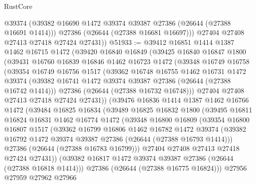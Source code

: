 \begin{lexlean}{RustCore}
\begin{coremodule}
          @39374
          (@39382 @16690 @1472 @39374 @39387 @27386 (@26644 (@27388 @16691 @1414)))
          @27386
          (@26644 (@27388 @16681 @16697)))
        @27404
        @27408
        @27413
        @27418
        @27424
        @27431))
@51933 := @39412
    @16851
    @1414
    @1387
    @1462
    @16715
    @1472
    (@39420
      @16840
      @16849
      (@39425
        @16840
        @16847
        @1800
        (@39431
          @16760
          @16839
          @16846
          @1462
          @16723
          @1472
          (@39348
            @16749
            @16758
            (@39354
              @16749
              @16756
              @1517
              (@39362
                @16748
                @16755
                @1462
                @16731
                @1472
                @39374
                (@39382 @16741 @1472 @39374 @39387 @27386 (@26644 (@27388 @16742 @1414)))
                @27386
                (@26644 (@27388 @16732 @16748)))
              @27404
              @27408
              @27413
              @27418
              @27424
              @27431))
          (@39476
            @16836
            @1414
            @1387
            @1462
            @16766
            @1472
            (@39484
              @16825
              @16834
              (@39489
                @16825
                @16832
                @1800
                (@39495
                  @16811
                  @16824
                  @16831
                  @1462
                  @16774
                  @1472
                  (@39348
                    @16800
                    @16809
                    (@39354
                      @16800
                      @16807
                      @1517
                      (@39362
                        @16799
                        @16806
                        @1462
                        @16782
                        @1472
                        @39374
                        (@39382 @16792 @1472 @39374 @39387 @27386 (@26644 (@27388 @16793 @1414)))
                        @27386
                        (@26644 (@27388 @16783 @16799)))
                      @27404
                      @27408
                      @27413
                      @27418
                      @27424
                      @27431))
                  (@39382 @16817 @1472 @39374 @39387 @27386 (@26644 (@27388 @16818 @1414)))
                  @27386
                  (@26644 (@27388 @16775 @16824)))
                @27956
                @27959
                @27962
                @27966

\end{coremodule}
\end{lexlean}
